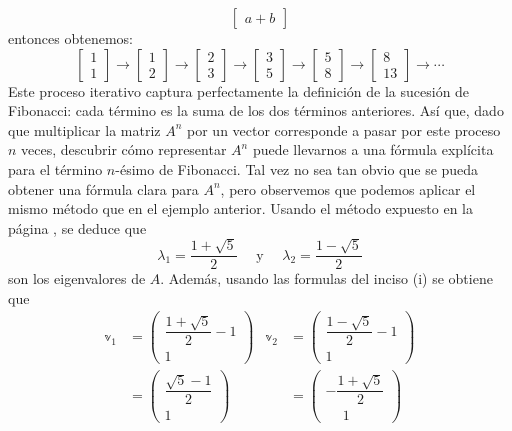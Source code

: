 \begin{example}
$$\begin{bmatrix}
        a + b
    \end{bmatrix}$$
    entonces obtenemos:
    $$\begin{bmatrix}
        1 \\
        1
    \end{bmatrix} \to \begin{bmatrix}
        1 \\
        2
    \end{bmatrix} \to \begin{bmatrix}
        2 \\
        3
    \end{bmatrix} \to \begin{bmatrix}
        3 \\
        5
    \end{bmatrix} \to \begin{bmatrix}
        5 \\
        8
    \end{bmatrix} \to \begin{bmatrix}
        8 \\
        13
    \end{bmatrix} \to \cdots$$
    Este proceso iterativo captura perfectamente la definición de la sucesión de Fibonacci: cada término es la suma de los dos términos anteriores. Así que, dado que multiplicar la matriz $A^n$ por un vector corresponde a pasar por este proceso $n$ veces, descubrir cómo representar $A^n$ puede llevarnos a una fórmula explícita para el término $n$-ésimo de Fibonacci. Tal vez no sea tan obvio que se pueda obtener una fórmula clara para $A^n$, pero observemos que podemos aplicar el mismo método que en el ejemplo anterior. Usando el método expuesto en la página \pageref{metodo_eigen_2x2}, se deduce que
    $$\lambda_1 = \frac{1 + \sqrt{5}}{2} \quad \text{ y } \quad \lambda_2 = \frac{1 - \sqrt{5}}{2}$$
    son los eigenvalores de $A$. Además, usando las formulas del inciso (i) se obtiene que
    \begin{align*}
        \mathbb{v}_1 & = \begin{pmatrix} \dfrac{1 + \sqrt{5}}{2} - 1 \\[3mm] 1 \end{pmatrix} & \mathbb{v}_2 & = \begin{pmatrix} \dfrac{1 - \sqrt{5}}{2} - 1 \\[3mm] 1 \end{pmatrix} \\
        & = \begin{pmatrix} \dfrac{\sqrt{5} - 1}{2} \\[3mm] 1 \end{pmatrix} & & = \begin{pmatrix} -\dfrac{1 + \sqrt{5}}{2} \\[3mm] \phantom{-} 1 \end{pmatrix}

\end{align*}
\end{example}
